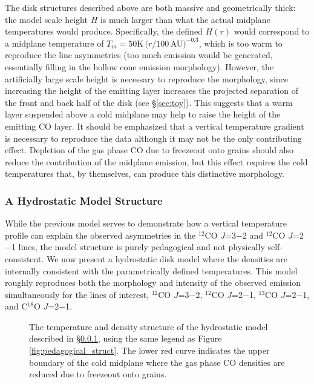 The disk structures described above are both massive and geometrically thick: 
the model scale height $H$ is much larger than what the actual midplane 
temperatures would produce.  Specifically, the defined $H(r)$ would correspond 
to a midplane temperature of $T_m = 50$K\,$(r/100$\,AU$)^{-0.3}$, which is too 
warm to reproduce the line asymmetries (too much emission would be generated, 
essentially filling in the hollow cone emission morphology).  However, the 
artificially large scale height is necessary to reproduce the morphology, since 
increasing the height of the emitting layer increases the projected separation 
of the front and back half of the disk (see \S\ref{sec:toy}).  This suggests 
that a warm layer suspended above a cold midplane may help to raise the height 
of the emitting CO layer.  It should be emphasized that a vertical temperature 
gradient is necessary to reproduce the data although it may not be the only 
contributing effect.  Depletion of the gas phase CO due to freezeout onto grains
should also reduce the contribution of the midplane emission, but this effect 
requires the cold temperatures that, by themselves, can produce this 
distinctive morphology.

\subsubsection{A Hydrostatic Model Structure}\label{sec:hydro}
While the previous model serves to demonstrate how a vertical temperature 
profile can explain the observed asymmetries in the $^{12}$CO $J$=3$-$2 and 
$^{12}$CO $J$=2$-$1 lines, the model structure is purely pedagogical and not 
physically self-consistent.  We now present a hydrostatic disk model where the 
densities are internally consistent with the parametrically defined 
temperatures.  This model roughly reproduces both the morphology and intensity 
of the observed emission simultaneously for the lines of interest, 
$^{12}$CO $J$=3$-$2, $^{12}$CO $J$=2$-$1, $^{13}$CO $J$=2$-$1, and 
C$^{18}$O $J$=2$-$1.

\begin{figure}[t!]
\caption{The temperature and density structure of the hydrostatic model 
described in \S\ref{sec:hydro}, using the same legend as Figure 
\ref{fig:pedagogical_struct}.  The lower red curve indicates the upper boundary 
of the cold midplane where the gas phase CO densities are reduced due to 
freezeout onto grains.
\label{fig:hydro_struct}}
\end{figure}

